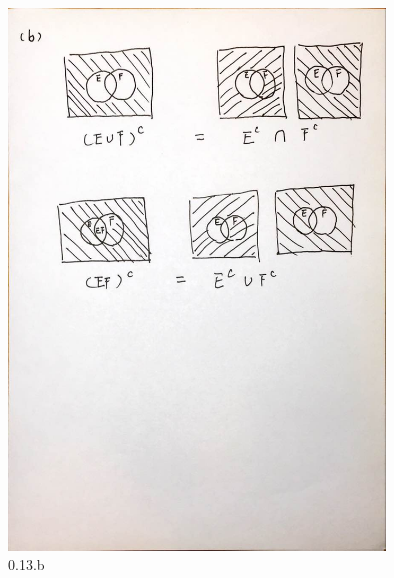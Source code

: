 \documentclass{article}[11pt]
\begin{document}
    \begin{figure}[H]
        \begin{center}
        \includegraphics[width=10cm]{./imgs/2-13b.jpg}
        \caption{0.13.b}
        \end{center}
    \end{figure}
\end{document}
